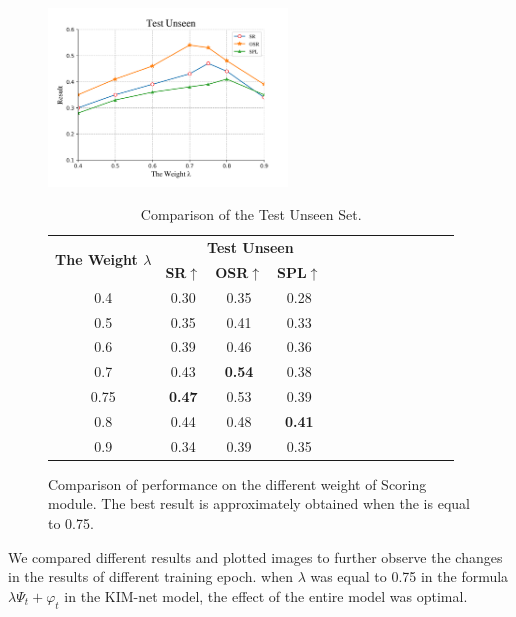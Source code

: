\begin{figure}[h]
	\begin{minipage}{0.5\textwidth}
		\includegraphics[width=2.5in]{Figure_4.png}
	\end{minipage}
	\hfill
	\begin{minipage}{0.5\textwidth}
		\begin{table}[H]
			\vspace{-2em}
			\centering
			\caption{Comparison of the Test Unseen Set.}
			{\begin{tabular}[c]{ccccccccccccc}
					\toprule[1pt]
					\multirow{2}{*}{{\textbf{The Weight ${\lambda}$}}} & \multicolumn{4}{c}{{\textbf{Test Unseen}}} \\
					
					& \textbf{SR}$\uparrow$ & \textbf{OSR}$\uparrow$ & \textbf{SPL}$\uparrow$	&  \\
					\toprule[1pt]
					
					0.4   & 0.30 & 0.35 & 0.28 \\
					0.5  & 0.35 &  0.41 & 0.33  \\
					0.6    & 0.39 & 0.46 & 0.36  \\
					0.7 	& 0.43 & \textbf{0.54} & 0.38 \\
					0.75   & \textbf{0.47} &  0.53 & 0.39 \\
					0.8   & 0.44 & 0.48 & \textbf{0.41} \\
					0.9   & 0.34 & 0.39 & 0.35 \\
					\bottomrule[1pt]
				\end{tabular}
				\label{table_3}}
		\end{table}
	\end{minipage}
	\caption{Comparison of performance on the different weight of Scoring module. The best result is approximately obtained when the  is equal to 0.75.}
\end{figure}
We compared different results and plotted images to further observe the changes in the results of different training epoch. when ${{\lambda}}$ was equal to 0.75 in the formula ${{\lambda}{\Psi}_{t} + {\varphi}_{t}}$ in the KIM-net model, the effect of the entire model was optimal.

